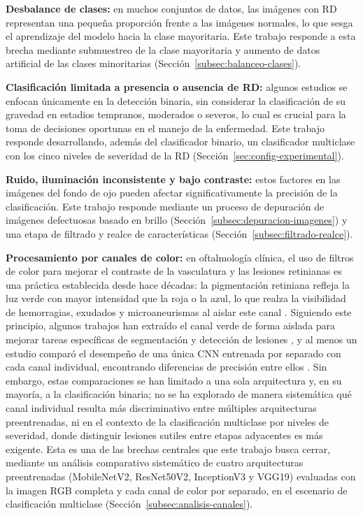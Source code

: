 \textbf{Desbalance de clases:} en muchos conjuntos de datos, las imágenes con RD
representan una pequeña proporción frente a las imágenes normales, lo que sesga el
aprendizaje del modelo hacia la clase mayoritaria. Este trabajo responde a esta brecha
mediante submuestreo de la clase mayoritaria y aumento de datos artificial de las clases
minoritarias (Sección~\ref{subsec:balanceo-clases}).

\textbf{Clasificación limitada a presencia o ausencia de RD:} algunos estudios se
enfocan únicamente en la detección binaria, sin considerar la clasificación de su
gravedad en estadios tempranos, moderados o severos, lo cual es crucial para la toma de
decisiones oportunas en el manejo de la enfermedad. Este trabajo responde desarrollando,
además del clasificador binario, un clasificador multiclase con los cinco niveles de
severidad de la RD (Sección~\ref{sec:config-experimental}).

\textbf{Ruido, iluminación inconsistente y bajo contraste:} estos factores en las
imágenes del fondo de ojo pueden afectar significativamente la precisión de la
clasificación. Este trabajo responde mediante un proceso de depuración de imágenes
defectuosas basado en brillo (Sección~\ref{subsec:depuracion-imagenes}) y una etapa de
filtrado y realce de características (Sección~\ref{subsec:filtrado-realce}).

\textbf{Procesamiento por canales de color:} en oftalmología clínica, el uso de filtros
de color para mejorar el contraste de la vasculatura y las lesiones retinianas es una
práctica establecida desde hace décadas: la pigmentación retiniana refleja la luz verde
con mayor intensidad que la roja o la azul, lo que realza la visibilidad de hemorragias,
exudados y microaneurismas al aislar este canal . Siguiendo
este principio, algunos trabajos han extraído el canal verde de forma aislada para
mejorar tareas específicas de segmentación y detección de lesiones
, y al menos un estudio comparó el desempeño de una única
CNN entrenada por separado con cada canal individual, encontrando diferencias de
precisión entre ellos . Sin embargo, estas comparaciones
se han limitado a una sola arquitectura y, en su mayoría, a la clasificación binaria; no
se ha explorado de manera sistemática qué canal individual resulta más discriminativo
entre múltiples arquitecturas preentrenadas, ni en el contexto de la clasificación
multiclase por niveles de severidad, donde distinguir lesiones sutiles entre etapas
adyacentes es más exigente. Esta es una de las brechas centrales que este trabajo busca
cerrar, mediante un análisis comparativo sistemático de cuatro arquitecturas
preentrenadas (MobileNetV2, ResNet50V2, InceptionV3 y VGG19) evaluadas con la imagen RGB
completa y cada canal de color por separado, en el escenario de clasificación multiclase
(Sección~\ref{subsec:analisis-canales}).

